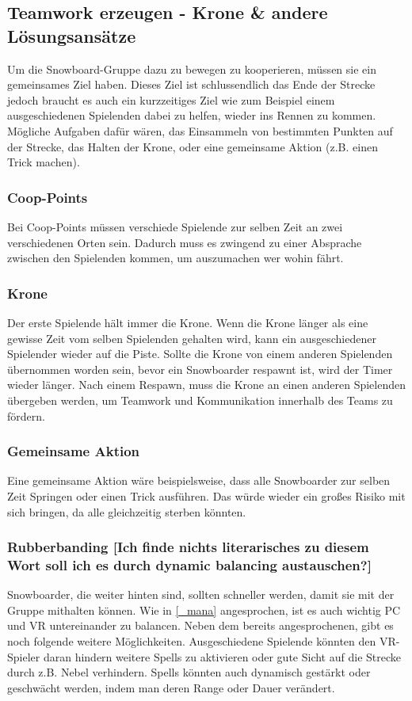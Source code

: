 \subsection{Teamwork erzeugen - Krone \& andere Lösungsansätze\label{_teamwork_erzeugen}}
Um die Snowboard-Gruppe dazu zu bewegen zu kooperieren, müssen sie ein gemeinsames Ziel haben. Dieses Ziel ist schlussendlich das Ende der Strecke jedoch braucht es auch ein kurzzeitiges Ziel wie zum Beispiel einem ausgeschiedenen Spielenden dabei zu helfen, wieder ins Rennen zu kommen. Mögliche Aufgaben dafür wären, das Einsammeln von bestimmten Punkten auf der Strecke, das Halten der Krone, oder eine gemeinsame Aktion (z.B. einen Trick machen).

\subsubsection{Coop-Points}
Bei Coop-Points müssen verschiede Spielende zur selben Zeit an zwei verschiedenen Orten sein. Dadurch muss es zwingend zu einer Absprache zwischen den Spielenden kommen, um auszumachen wer wohin fährt.

\subsubsection{Krone\label{_krone}}
Der erste Spielende hält immer die Krone. Wenn die Krone länger als eine gewisse Zeit vom selben Spielenden gehalten wird, kann ein ausgeschiedener Spielender wieder auf die Piste. Sollte die Krone von einem anderen Spielenden übernommen worden sein, bevor ein Snowboarder respawnt ist, wird der Timer wieder länger. Nach einem Respawn, muss die Krone an einen anderen Spielenden übergeben werden, um Teamwork und Kommunikation innerhalb des Teams zu fördern.

\subsubsection{Gemeinsame Aktion}
Eine gemeinsame Aktion wäre beispielsweise, dass alle Snowboarder zur selben Zeit Springen oder einen Trick ausführen. Das würde wieder ein großes Risiko mit sich bringen, da alle gleichzeitig sterben könnten.

\subsubsection{Rubberbanding [Ich finde nichts literarisches zu diesem Wort soll ich es durch dynamic balancing austauschen?]\label{_rubberbanding}}
Snowboarder, die weiter hinten sind, sollten schneller werden, damit sie mit der Gruppe mithalten können. Wie in \ref{_mana} angesprochen, ist es auch wichtig PC und VR untereinander zu balancen. Neben dem bereits angesprochenen, gibt es noch folgende weitere Möglichkeiten. Ausgeschiedene Spielende könnten den VR-Spieler daran hindern weitere Spells zu aktivieren oder gute Sicht auf die Strecke durch z.B. Nebel verhindern. Spells könnten auch dynamisch gestärkt oder geschwächt werden, indem man deren Range oder Dauer verändert.